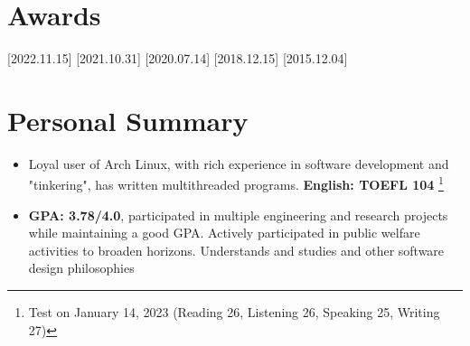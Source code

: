 \documentclass{resume}
\begin{document}


    \section{Awards}
    [2022.11.15]
    [2021.10.31]
    [2020.07.14]
    [2018.12.15]
    [2015.12.04]



    \section{Personal Summary}

    \begin{itemize}
        \item Loyal user of Arch Linux, with rich experience in software development and "tinkering", has written multithreaded programs. \textbf{English: TOEFL 104} \footnote{Test on January 14, 2023 (Reading 26, Listening 26, Speaking 25, Writing 27)}
        \item \textbf{GPA: 3.78/4.0}, participated in multiple engineering and research projects while maintaining a good GPA. Actively participated in public welfare activities to broaden horizons. Understands and studies  and other software design philosophies

    \end{itemize}
\end{document}
